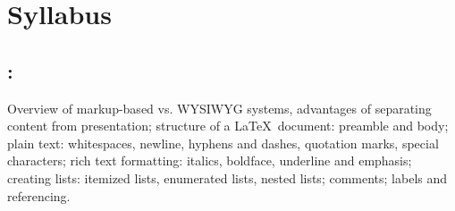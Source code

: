 \section*{Syllabus}

    \subsection*{\topicSubTitle: \topicTitle}
        Overview of markup-based vs. WYSIWYG systems, advantages of separating content from presentation; structure of a \LaTeX\ document: preamble and body; plain text: whitespaces, newline, hyphens and dashes, quotation marks, special characters; rich text formatting: italics, boldface, underline and emphasis; creating lists: itemized lists, enumerated lists, nested lists; comments; labels and referencing.